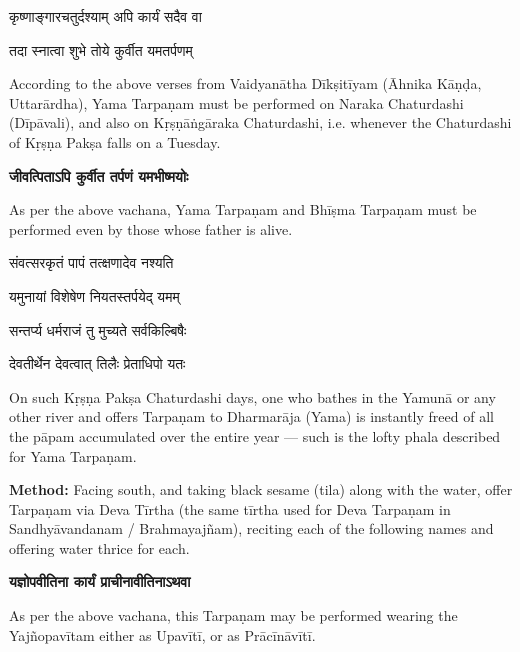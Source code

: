 
{कृष्णाङ्गारचतुर्दश्याम् अपि कार्यं सदैव वा}

{तदा स्नात्वा शुभे तोये कुर्वीत यमतर्पणम्}

{\sffamily According to the above verses from Vaidyanātha Dīkṣitīyam (Āhnika Kāṇḍa, Uttarārdha), Yama Tarpaṇam must be performed on Naraka Chaturdashi (Dīpāvali), and also on Kṛṣṇāṅgāraka Chaturdashi, i.e. whenever the Chaturdashi of Kṛṣṇa Pakṣa falls on a Tuesday.}

\centerline{\bfseries जीवत्पिताऽपि कुर्वीत तर्पणं यमभीष्मयोः}\nobreak

{\sffamily As per the above vachana, Yama Tarpaṇam and Bhīṣma Tarpaṇam must be performed even by those whose father is alive.}

{संवत्सरकृतं पापं तत्क्षणादेव नश्यति}

{यमुनायां विशेषेण नियतस्तर्पयेद् यमम्}

{सन्तर्प्य धर्मराजं तु मुच्यते सर्वकिल्बिषैः}

{देवतीर्थेन देवत्वात् तिलैः प्रेताधिपो यतः}

{\sffamily On such Kṛṣṇa Pakṣa Chaturdashi days, one who bathes in the Yamunā or any other river and offers Tarpaṇam to Dharmarāja (Yama) is instantly freed of all the pāpam accumulated over the entire year — such is the lofty phala described for Yama Tarpaṇam.}

\faClockO{} {\sffamily \textbf{Method:} Facing south, and taking black sesame (tila) along with the water, offer Tarpaṇam via Deva Tīrtha (the same tīrtha used for Deva Tarpaṇam in Sandhyāvandanam / Brahmayajñam), reciting each of the following names and offering water thrice for each.}

\centerline{\bfseries यज्ञोपवीतिना कार्यं प्राचीनावीतिनाऽथवा}

{\sffamily As per the above vachana, this Tarpaṇam may be performed wearing the Yajñopavītam either as Upavītī, or as Prācīnāvītī.}

\medskip


